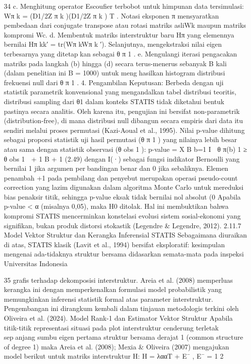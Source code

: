 34
c. Menghitung operator Escoufier terbobot untuk himpunan data tersimulasi:
Wπ
k = (D1/2Z
π
k
)(D1/2Z
π
k
)
T
. Notasi eksponen π mensyaratkan pembedaan
dari conjugate transpose atau rotasi matriks asliWk maupun matriks kompromi
Wc.
d. Membentuk matriks interstruktur baru Hπ yang elemennya bernilai Hπ
kk′ =
tr(Wπ
kWπ
k
′). Selanjutnya, mengekstraksi nilai eigen terbesarnya yang ditetapkan sebagai θ
π
1
.
e. Mengulangi iterasi pengacakan matriks pada langkah (b) hingga (d) secara
terus-menerus sebanyak B kali (dalam penelitian ini B = 1000) untuk menghasilkan histogram distribusi frekuensi null dari θ
π
1
.
4. Pengambilan Keputusan: Berbeda dengan uji statistik parametrik konvensional
yang mengandalkan tabel distribusi teoritis, distribusi sampling dari θ1 dalam konteks
STATIS tidak diketahui bentuk pastinya secara analitis. Oleh karena itu, pengujian
ini bersifat non-parametrik (distribution-free), di mana distribusi null dibangun
secara empiris dari data itu sendiri melalui proses permutasi (Kazi-Aoual et al.,
1995).
Nilai p-value dihitung sebagai proporsi statistik uji hasil permutasi (θ
π
1
) yang nilainya
lebih besar atau sama dengan statistik observasi (θ
obs
1
):
p-value =
X
B
b=1
I

θ
π(b)
1 ≥ θ
obs
1

+ 1
B + 1
(2.49)
dengan I(·) sebagai fungsi indikator Bernoulli yang bernilai 1 jika argumen perbandingan benar dan 0 jika sebaliknya. Elemen penambah +1 pada pembilang dan
penyebut merupakan operasi pseudo-count correction yang lazim digunakan dalam
algoritma Monte Carlo untuk mereduksi bias penaksir titik, sehingga p-value eksak
tidak bernilai nol absolut (0%
Apabila p-value < α (misalnya 0,05), maka H0 ditolak. Hal ini membuktikan bahwa
kompromi STATIS mencerminkan konstelasi evolusi sistem sosial-ekonomi yang
signifikan, bukan produk distorsi stokastik (Legendre & Legendre, 2012).
2.11.7 Model Vektor Struktur dan Kerangka Inferensial STATIS
Sebagaimana diuraikan di atas, STATIS klasik (Lavit et al., 1994) bersifat eksploratif:
kesimpulan mengenai ada-tidaknya struktur bersama didasarkan semata-mata pada inspeksi
Universitas Indonesia

35
grafis terhadap dekomposisi interstruktur. Areia et al. (2008) memperluas kerangka ini
dengan memperkenalkan formulasi model probabilistik yang memungkinkan inferensi
statistik formal atas parameter interstruktur. Pengembangan ini dirangkum kembali dalam
tinjauan metodologis terkini oleh Oliveira et al. (2024).
Model Rank-1 dan Estimator Vektor Struktur
Apabila titik-titik representasi situasi pada plot interstruktur cenderung terletak sepanjang sumbu eigen pertama struktur bersama derajat 1 (common structure of degree
1) maka Areia et al. (2008); Mexia & Oliveira (2007) mengajukan model berikut untuk
matriks interstruktur H:
H = λααT + E¯ , E¯ =
1
2

